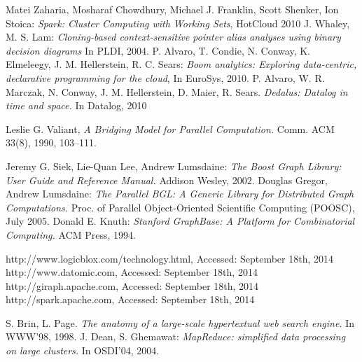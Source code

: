 \documentclass{pracamgr}
\theoremstyle{plain}
\theoremstyle{definition}
\theoremstyle{remark}
\begin{document}
\begin{thebibliography}{99}
 Matei Zaharia, Mosharaf Chowdhury, Michael J. Franklin, Scott Shenker, Ion Stoica: \textit{Spark: Cluster Computing with Working Sets}, HotCloud 2010
 J. Whaley, M. S. Lam: \textit{Cloning-based context-sensitive pointer alias analyses using binary decision diagrams} In PLDI, 2004.
 P. Alvaro, T. Condie, N. Conway, K. Elmeleegy, J. M. Hellerstein, R. C. Sears: \textit{Boom analytics: Exploring data-centric, declarative programming for the cloud}, In EuroSys, 2010.
 P. Alvaro, W. R. Marczak, N. Conway, J. M. Hellerstein, D. Maier, R. Sears. \textit{Dedalus: Datalog in time and space.} In Datalog, 2010

 Leslie G. Valiant, \emph{A Bridging Model for Parallel Computation.} Comm. ACM 33(8), 1990, 103–111.

 Jeremy G. Siek, Lie-Quan Lee, Andrew Lumsdaine: \textit{The Boost Graph Library: User Guide and Reference Manual.} Addison Wesley, 2002.
 Douglas Gregor, Andrew Lumsdaine: \textit{The Parallel BGL: A Generic Library for Distributed Graph Computations.} Proc. of Parallel Object-Oriented Scientific Computing (POOSC), July 2005.
 Donald E. Knuth: \textit{Stanford GraphBase: A Platform for Combinatorial Computing.} ACM Press, 1994.

 http://www.logicblox.com/technology.html, Accessed: September 18th, 2014
 http://www.datomic.com, Accessed: September 18th, 2014
 http://giraph.apache.com, Accessed: September 18th, 2014
 http://spark.apache.com, Accessed: September 18th, 2014

 S. Brin, L. Page. \textit{The anatomy of a large-scale hypertextual web search engine.} In WWW’98, 1998.
 J. Dean, S. Ghemawat: \textit{MapReduce: simplified data processing on large clusters.} In OSDI’04, 2004.


\end{thebibliography}
\end{document}
